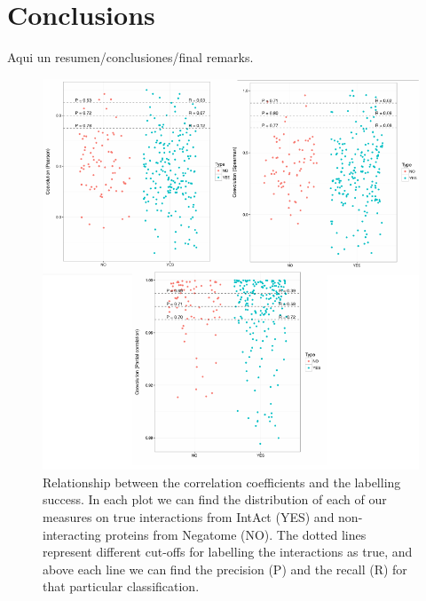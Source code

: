 \documentclass[11pt]{article}
\begin{document}
\section{Conclusions}
Aqui un resumen/conclusiones/final remarks.

\begin{figure}[t]
	\includegraphics[width=1.0\textwidth]{graphics3}
	\enspace \caption{Relationship between the correlation coefficients and the labelling success. In each plot we can find the distribution of each of our measures on true interactions from IntAct (YES) and non-interacting proteins from Negatome (NO). The dotted lines represent different cut-offs for labelling the interactions as true, and above each line we can find the precision (P) and the recall (R) for that particular classification.}
\end{figure}


	
\end{document}
